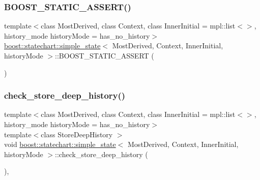 \subsubsection{\texorpdfstring{B\+O\+O\+S\+T\+\_\+\+S\+T\+A\+T\+I\+C\+\_\+\+A\+S\+S\+E\+R\+T()}{BOOST\_STATIC\_ASSERT()}\hspace{0.1cm}{\footnotesize\ttfamily [2/2]}}
{\footnotesize\ttfamily template$<$class Most\+Derived, class Context, class Inner\+Initial = mpl\+::list$<$$>$, history\+\_\+mode history\+Mode = has\+\_\+no\+\_\+history$>$ \\
\mbox{\hyperlink{classboost_1_1statechart_1_1simple__state}{boost\+::statechart\+::simple\+\_\+state}}$<$ Most\+Derived, Context, Inner\+Initial, history\+Mode $>$\+::B\+O\+O\+S\+T\+\_\+\+S\+T\+A\+T\+I\+C\+\_\+\+A\+S\+S\+E\+RT (\begin{DoxyParamCaption}\item[{(mpl\+::or\+\_\+$<$ mpl\+::less$<$ \mbox{\hyperlink{classboost_1_1statechart_1_1simple__state_abee09a2cb17ed7db5457d3f09bb75f9c}{no\+\_\+of\+\_\+orthogonal\+\_\+regions}}, mpl\+::integral\+\_\+c$<$ \mbox{\hyperlink{namespaceboost_1_1statechart_1_1detail_a3bedea0b807a16fa222733417183d2c9}{detail\+::orthogonal\+\_\+position\+\_\+type}}, 2 $>$ $>$, mpl\+::not\+\_\+$<$ typename context\+\_\+type\+::inherited\+\_\+deep\+\_\+history $>$ $>$\+::value)}]{ }\end{DoxyParamCaption})}

\mbox{\label{classboost_1_1statechart_1_1simple__state_a5f704c34f439bc3cb3c7f547405da725}} 
\subsubsection{\texorpdfstring{check\+\_\+store\+\_\+deep\+\_\+history()}{check\_store\_deep\_history()}}
{\footnotesize\ttfamily template$<$class Most\+Derived, class Context, class Inner\+Initial = mpl\+::list$<$$>$, history\+\_\+mode history\+Mode = has\+\_\+no\+\_\+history$>$ \\
template$<$class Store\+Deep\+History $>$ \\
void \mbox{\hyperlink{classboost_1_1statechart_1_1simple__state}{boost\+::statechart\+::simple\+\_\+state}}$<$ Most\+Derived, Context, Inner\+Initial, history\+Mode $>$\+::check\+\_\+store\+\_\+deep\+\_\+history (\begin{DoxyParamCaption}{ }\end{DoxyParamCaption})\hspace{0.3cm}{\ttfamily [inline]}, {\ttfamily [private]}}

